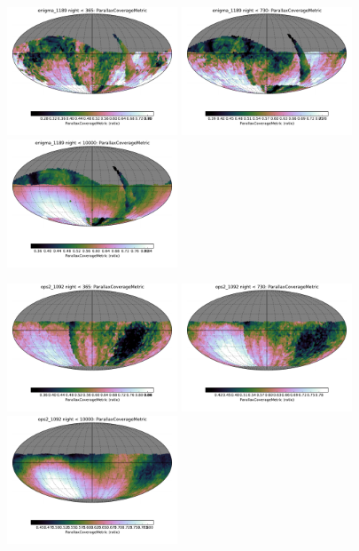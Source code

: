 \begin{figure}[ht]
  \begin{center}
  \includegraphics[width=2.0in]{./figs/milkyway/MW_Astrom_paCovge_1189_01y_map.pdf}
  \includegraphics[width=2.0in]{./figs/milkyway/MW_Astrom_paCovge_1189_02y_map.pdf}
  \includegraphics[width=2.0in]{./figs/milkyway/MW_Astrom_paCovge_1189_10y_map.pdf}
  \end{center}
  \begin{center}
  \includegraphics[width=2.0in]{./figs/milkyway/MW_Astrom_paCovge_1092_01y_map.pdf}
  \includegraphics[width=2.0in]{./figs/milkyway/MW_Astrom_paCovge_1092_02y_map.pdf}
  \includegraphics[width=2.0in]{./figs/milkyway/MW_Astrom_paCovge_1092_10y_map.pdf}
  \end{center}


\end{figure}
